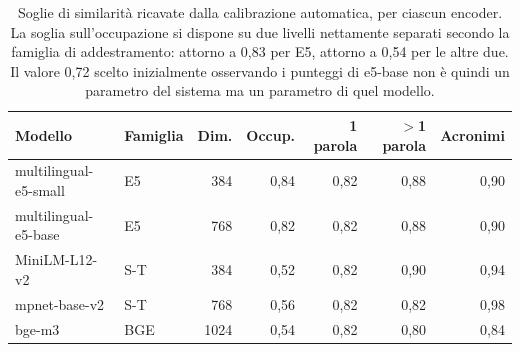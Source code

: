 \begin{table}[htbp]
  \centering
  \caption{Soglie di similarità ricavate dalla calibrazione automatica, per
           ciascun encoder. La soglia sull'occupazione si dispone su due livelli
           nettamente separati secondo la famiglia di addestramento: attorno a
           0,83 per E5, attorno a 0,54 per le altre due. Il valore 0,72 scelto
           inizialmente osservando i punteggi di e5-base non è quindi un
           parametro del sistema ma un parametro di quel modello.}
  \label{tab:soglie-calibrate}
  \begin{tabular}{llrrrrr}
    \toprule
    \textbf{Modello} & \textbf{Famiglia} & \textbf{Dim.}
      & \textbf{Occup.} & \textbf{1 parola} & \textbf{$>$1 parola}
      & \textbf{Acronimi} \\
    \midrule
    multilingual-e5-small & E5  & 384  & 0,84 & 0,82 & 0,88 & 0,90 \\
    multilingual-e5-base  & E5  & 768  & 0,82 & 0,82 & 0,88 & 0,90 \\
    \midrule
    MiniLM-L12-v2         & S-T & 384  & 0,52 & 0,82 & 0,90 & 0,94 \\
    mpnet-base-v2         & S-T & 768  & 0,56 & 0,82 & 0,82 & 0,98 \\
    \midrule
    bge-m3                & BGE & 1024 & 0,54 & 0,82 & 0,80 & 0,84 \\
    \bottomrule
  \end{tabular}
\end{table}
